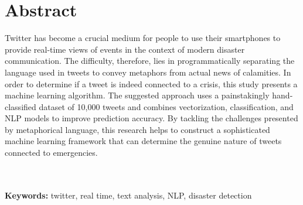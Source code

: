 \chapter*{\center \Large  Abstract}

Twitter has become a crucial medium for people to use their smartphones to provide real-time 
views of events in the context of modern disaster communication. The difficulty, therefore, 
lies in programmatically separating the language used in tweets to convey metaphors from actual 
news of calamities. In order to determine if a tweet is indeed connected to a crisis, this 
study presents a machine learning algorithm. The suggested approach uses a painstakingly hand-
classified dataset of 10,000 tweets and combines vectorization, classification, and NLP models 
to improve prediction accuracy. By tackling the challenges presented by metaphorical language, 
this research helps to construct a sophisticated machine learning framework that can determine 
the genuine nature of tweets connected to emergencies.

~\\[1cm]%

~\\[1cm]
\noindent %
\textbf{Keywords:} twitter, real time, text analysis, NLP, disaster detection

\vfill
\noindent


